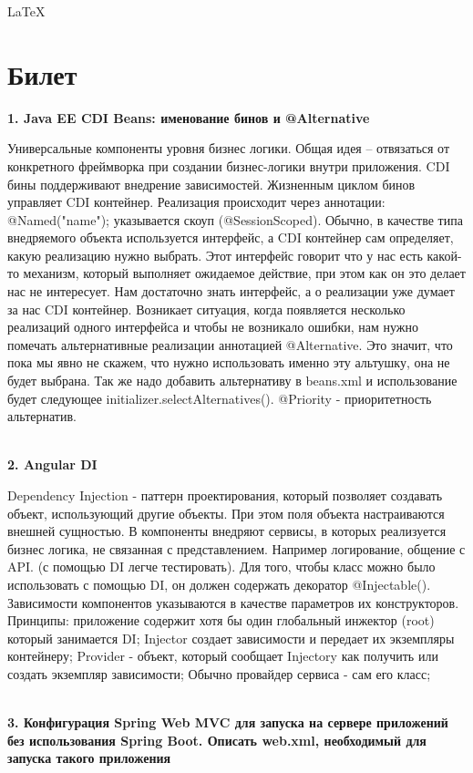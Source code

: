 \documentclass{article}
\newcommand{\bil}[5]{%
        \section{Билет}
        \textbf{1. #1}

        #4
        \\
        \textbf{2. #2}
        
        #5
        \\
        \textbf{3. #3}
}
\begin{document}
\begin{center}
    \LaTeX
\end{center}
\bil{Java EE CDI Beans: именование бинов и @Alternative}{Angular DI}{Конфигурация Spring Web MVC для запуска на сервере приложений без использования Spring Boot. Описать web.xml, необходимый для запуска такого приложения}{
    Универсальные компоненты уровня бизнес логики. Общая идея – отвязаться 
    от конкретного фреймворка при создании бизнес-логики внутри приложения.
    CDI бины поддерживают внедрение зависимостей. 
    Жизненным циклом бинов управляет CDI контейнер. 
    Реализация происходит через аннотации: @Named("name"); 
    указывается скоуп (@SessionScoped).
    Обычно, в качестве типа внедряемого объекта используется интерфейс, а CDI контейнер сам определяет, какую реализацию нужно выбрать.
    Этот интерфейс говорит что у нас есть какой-то механизм, который выполняет ожидаемое действие, при этом как он это делает нас не интересует.
    Нам достаточно знать интерфейс, а о реализации уже думает за нас CDI контейнер.
    Возникает ситуация, когда появляется несколько реализаций одного интерфейса и чтобы не возникало ошибки, нам нужно помечать альтернативные реализации аннотацией @Alternative.
    Это значит, что пока мы явно не скажем, что нужно использовать именно эту альтушку, она не будет выбрана.
    Так же надо добавить альтернативу в beans.xml и использование будет следующее initializer.selectAlternatives(). @Priority - приоритетность альтернатив.
}{
    Dependency Injection - паттерн проектирования, который позволяет создавать объект, использующий другие объекты. 
    При этом поля объекта настраиваются внешней сущностью. В компоненты внедряют сервисы, 
    в которых реализуется бизнес логика, не связанная с представлением. Например логирование, общение с API. 
    (с помощью DI легче тестировать). Для того, чтобы класс можно было использовать с помощью DI, он должен содержать декоратор @Injectable(). 
    Зависимости компонентов указываются в качестве параметров их конструкторов. Принципы: приложение содержит хотя бы один глобальный инжектор 
    (root) который занимается DI; Injector создает зависимости и передает их экземпляры контейнеру;
     Provider - объект, который сообщает Injectory как получить или создать экземпляр зависимости; 
     Обычно провайдер сервиса - сам его класс;
}
\end{document}
